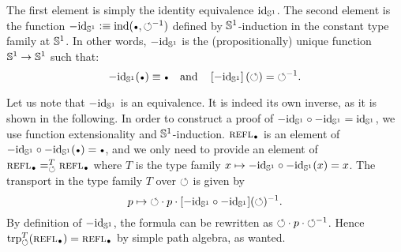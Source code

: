 \documentclass[english,a4paper]{lmcs}
\begin{document}
The first element is simply the identity equivalence $\mathord{\mathrm{id}}_{{\mathbb S^{1}}}$. The
second element is the function
$-\id_\Sc \defequi \ind(\base,\inv{\Sloop})$ defined by
${{\mathbb S^{1}}}$-induction in the constant type family at ${{\mathbb S^{1}}}$. In other words,
$-\mathord{\mathrm{id}}_{{\mathbb S^{1}}}$ is the (propositionally) unique function ${{\mathbb S^{1}}} \to {{\mathbb S^{1}}}$ such
that:
\begin{displaymath}
  -\id_\Sc(\base) \jdeq \base%
  \quad\text{and}\quad%
  \ap{-\id_\Sc}(\Sloop) = \inv{\Sloop}.
\end{displaymath}

Let us note that $-\mathord{\mathrm{id}}_{{\mathbb S^{1}}}$ is an equivalence. It is indeed its own inverse, as
it is shown in the following. In order to construct a proof of $-\mathord{\mathrm{id}}_{{\mathbb S^{1}}} \circ
-\mathord{\mathrm{id}}_{{\mathbb S^{1}}} = \mathord{\mathrm{id}}_{{\mathbb S^{1}}}$, we use function extensionality and ${{\mathbb S^{1}}}$-induction.
$\refl\base$ is an element of $-\id_\Sc\circ -\id_\Sc (\base) = \base$, and
we only need to provide an element of $\pathover {\refl\base} T \Sloop
{\refl\base}$ where $T$ is the type family $x \mapsto -\mathord{\mathrm{id}}_{{\mathbb S^{1}}} \circ -\mathord{\mathrm{id}}_{{\mathbb S^{1}}} (x)
= x$. The transport in the type family $T$ over $\mathord{\circlearrowleft}$ is given by
\begin{displaymath}
  p \mapsto \mathord{\circlearrowleft} \cdot p \cdot [-\mathord{\mathrm{id}}_{{\mathbb S^{1}}} \circ -\mathord{\mathrm{id}}_{{\mathbb S^{1}}}](\mathord{\circlearrowleft})^{-1}.
\end{displaymath}
By definition of $-\mathord{\mathrm{id}}_{{\mathbb S^{1}}}$, the formula can be rewritten as $\mathord{\circlearrowleft} \cdot p
\cdot \mathord{\circlearrowleft}^{-1}$.  Hence $\trp[T] \Sloop (\refl\base) = \refl\base$ by simple
path algebra, as wanted.
\end{document}
